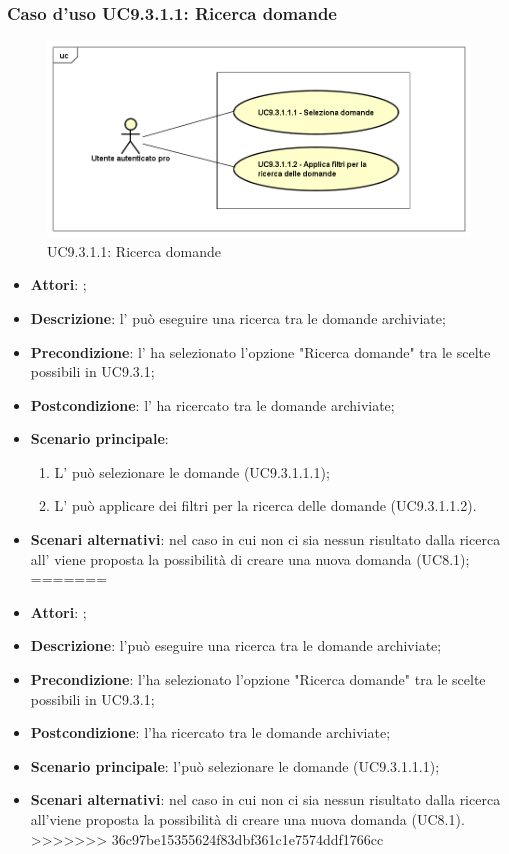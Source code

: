 		 \subsubsection{Caso d'uso UC9.3.1.1: Ricerca domande}
		 \label{UC9.3.1.1}
		 \begin{figure}[h]
		 	\centering
		 	\includegraphics[scale=0.5,keepaspectratio]{UML/UC9_3_1_1.png}
		 	\caption{UC9.3.1.1: Ricerca domande}
		 \end{figure}
		 \FloatBarrier
		 \begin{itemize}
<<<<<<< HEAD
		 	\item \textbf{Attori}: \uaupro{};
		 	\item \textbf{Descrizione}: l'\uaupro{} può eseguire una ricerca tra le domande archiviate; 
		 	\item \textbf{Precondizione}: l'\uaupro{} ha selezionato l'opzione "Ricerca domande" tra le scelte possibili in UC9.3.1;
		 	\item \textbf{Postcondizione}: l'\uaupro{} ha ricercato tra le domande archiviate;
		 	\item \textbf{Scenario principale}:
		 	\begin{enumerate}
		 		\item L'\uaupro{} può selezionare le domande (UC9.3.1.1.1); 
		 		\item L'\uaupro{} può applicare dei filtri per la ricerca delle domande (UC9.3.1.1.2).
		 	\end{enumerate}
		 	\item \textbf{Scenari alternativi}: nel caso in cui non ci sia nessun risultato dalla ricerca all'\uaupro{} viene proposta la possibilità di creare una nuova domanda (UC8.1);
=======
		 	\item \textbf{Attori}: \uaupro;
		 	\item \textbf{Descrizione}: l'\uaupro può eseguire una ricerca tra le domande archiviate; 
		 	\item \textbf{Precondizione}: l'\uaupro ha selezionato l'opzione "Ricerca domande" tra le scelte possibili in UC9.3.1;
		 	\item \textbf{Postcondizione}: l'\uaupro ha ricercato tra le domande archiviate;
		 	\item \textbf{Scenario principale}: l'\uaupro può selezionare le domande (UC9.3.1.1.1); 
		 	\item \textbf{Scenari alternativi}: nel caso in cui non ci sia nessun risultato dalla ricerca all'\uaupro viene proposta la possibilità di creare una nuova domanda (UC8.1).
>>>>>>> 36c97be15355624f83dbf361c1e7574ddf1766cc
		 \end{itemize}
		 
